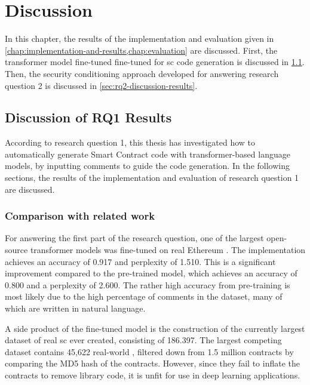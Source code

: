 \chapter{Discussion}
\label{chap:discussion}
In this chapter, the results of the implementation and evaluation given in \cref{chap:implementation-and-results,chap:evaluation} are discussed. First, the transformer model fine-tuned fine-tuned for \acrshort{sc} code generation is discussed in \cref{sec:rq1-discussion-results}. Then, the security conditioning approach developed for answering research question 2 is discussed in \cref{sec:rq2-discussion-results}.

\section{Discussion of RQ1 Results}
\label{sec:rq1-discussion-results}
According to research question 1, this thesis has investigated how to automatically generate Smart Contract code with transformer-based language models, by inputting comments to guide the code generation. In the following sections, the results of the implementation and evaluation of research question 1 are discussed.

\subsection{Comparison with related work}
\label{sec:rq1-comparison-with-related-work}
For answering the first part of the research question, one of the largest open-source transformer models was fine-tuned on real Ethereum . The implementation achieves an accuracy of 0.917 and perplexity of 1.510. This is a significant improvement compared to the pre-trained model, which achieves an accuracy of 0.800 and a perplexity of 2.600. The rather high accuracy from pre-training is most likely due to the high percentage of comments in the dataset, many of which are written in natural language. 

A side product of the fine-tuned model is the construction of the currently largest dataset of real \acrshort{sc} ever created, consisting of 186.397. The largest competing dataset \cite{ren2021empirical} contains 45,622 real-world , filtered down from 1.5 million contracts by comparing the MD5 hash of the contracts. However, since they fail to inflate the contracts to remove library code, it is unfit for use in deep learning applications.

